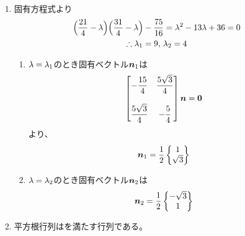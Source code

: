 \begin{ans*}
  ${}$
  \begin{enumerate}[label=(\arabic*)]
    \item 固有方程式より
    \begin{gather}
      \Bigl( \frac{21}{4} - {\lambda} \Bigr)
      \Bigl( \frac{31}{4} - {\lambda} \Bigr)
      -\frac{75}{16}
      = {\lambda}^2 - 13{\lambda} + 36 = 0 \\
      \therefore {\lambda}_1 = 9,\,{\lambda}_2 = 4
    \end{gather}
    \begin{enumerate}[label=(\roman*)]
      \item ${\lambda}={\lambda}_1$のとき固有ベクトル${\bm{n}}_1$は
      \begin{gather}
        \begin{bmatrix}
          \displaystyle -\frac{15}{4} & \displaystyle \frac{5\sqrt{3}}{4} \\
          & \\
          \displaystyle \frac{5\sqrt{3}}{4} & \displaystyle -\frac{5}{4}
        \end{bmatrix}{\bm{n}} = \bm{0}
      \end{gather}
      より、
      \begin{gather}
        {\bm{n}}_1 = \frac{1}{2}\begin{Bmatrix}
          1 \\ \sqrt{3}
        \end{Bmatrix}
      \end{gather}
      \item ${\lambda}={\lambda}_2$のとき固有ベクトル${\bm{n}}_2$は
      \begin{gather}
        {\bm{n}}_2 = \frac{1}{2}\begin{Bmatrix}
          -\sqrt{3} \\ 1
        \end{Bmatrix}
      \end{gather}
    \end{enumerate}
    \item 平方根行列はを満たす行列である。


\end{enumerate}
\end{ans*}
